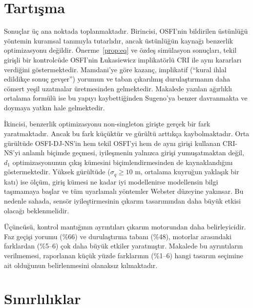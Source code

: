 \documentclass[11pt,a4paper]{article}
\theoremstyle{definition}
\newcommand{\osfins}{OSFI-DJ-NS}
\begin{document}
\section{Tartışma}
\label{sec:discussion}

Sonuçlar üç ana noktada toplanmaktadır. Birincisi, OSFI'nin bildirilen üstünlüğü yöntemin kuramsal tanımıyla tutarlıdır, ancak üstünlüğün kaynağı benzerlik optimizasyonu değildir. Önerme~\ref{prop:eq} ve özdeş simülasyon sonuçları, tekil girişli bir kontrolcüde OSFI'nin Łukasiewicz implikatörlü CRI ile aynı kararları verdiğini göstermektedir. Mamdani'ye göre kazanç, implikatif (``kural ihlal edildikçe sonuç gevşer'') yorumun ve taban çıkarılmış durulaştırmanın daha cömert yeşil uzatmalar üretmesinden gelmektedir. Makalede yazılan ağırlıklı ortalama formülü ise bu yapıyı kaybettiğinden Sugeno'ya benzer davranmakta ve doymaya yatkın hale gelmektedir.

İkincisi, benzerlik optimizasyonu non-singleton girişte gerçek bir fark yaratmaktadır. Ancak bu fark küçüktür ve gürültü arttıkça kaybolmaktadır. Orta gürültüde \osfins'in hem tekil OSFI'yi hem de aynı girişi kullanan CRI-NS'yi anlamlı biçimde geçmesi, iyileşmenin yalnızca girişi yumuşatmaktan değil, $d_1$ optimizasyonunun çıkış kümesini biçimlendirmesinden de kaynaklandığını göstermektedir. Yüksek gürültüde ($\sigma_q\ge10$ m, ortalama kuyruğun yaklaşık bir katı) ise ölçüm, giriş kümesi ne kadar iyi modellenirse modellensin bilgi taşımamaya başlar ve tüm uyarlamalı yöntemler Webster düzeyine yakınsar. Bu nedenle sahada, sensör iyileştirmesinin çıkarım tasarımından daha büyük etkisi olacağı beklenmelidir.

Üçüncüsü, kontrol mantığının ayrıntıları çıkarım motorundan daha belirleyicidir. Faz geçişi yorumu (\%66) ve durulaştırma tabanı (\%48), motorlar arasındaki farklardan (\%5--6) çok daha büyük etkiler yaratmıştır. Makalede bu ayrıntıların verilmemesi, raporlanan küçük yüzde farklarının (\%1--6) hangi tasarım seçimine ait olduğunun belirlenmesini olanaksız kılmaktadır.

\section{Sınırlılıklar}
\label{sec:limitations}
\end{document}
